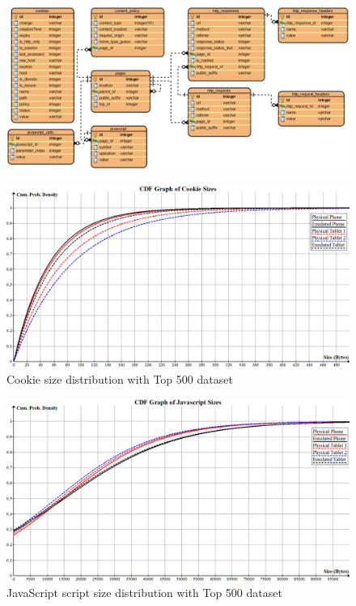 \documentclass{acm_proc_article-sp}
\begin{document}
\begin{figure}[ht] 
\centering \includegraphics[scale=0.70]{diagrams/db_diagram.png}
\label{fig:db_schema}
\end{figure}

\begin{figure}[ht] 
\centering \includegraphics[scale=0.30]{diagrams/cookies_cdf.png}
\caption{Cookie size distribution with Top 500 dataset}
\label{fig:cookie_cdf}
\end{figure}

\begin{figure}[ht] 
\centering \includegraphics[scale=0.30]{diagrams/javascript_cdf.png}
\caption{JavaScript script size distribution with Top 500 dataset}
\label{fig:cookie_cdf}
\end{figure}
\end{document}
